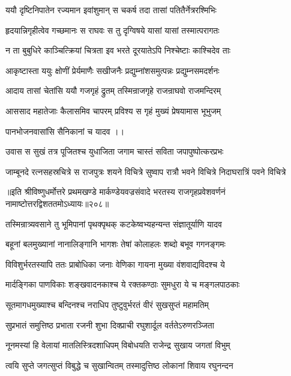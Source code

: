 \twolineshloka
{ययौ दृष्टिनिपातेन रज्यमान इवांशुमान्}
{स चकर्ष तदा तासां पतितैर्नेत्ररश्मिभिः}%

\twolineshloka
{हृदयान्निगृहीत्वेव गच्छमानः स राघवः}
{स तु दृग्विषये यासां यासां तस्मात्परागतः}%

\twolineshloka
{न ता बुबुधिरे काञ्चित्क्रियां चित्रता इव}
{भरते दूरयातेऽपि निश्चेष्टाः काश्चिदेव ताः} %

\twolineshloka
{आकृष्टास्ता ययुः क्षोणीं प्रेर्यमाणैः सखीजनैः}
{प्रद्युम्नांशसमुत्पन्नः प्रद्युम्नसमदर्शनः}%

\twolineshloka
{आदाय तासां चेतांसि ययौ गजगृहं द्रुतम्}
{तस्मिन्राजगृहे राजन्राघवो राजमन्दिरम्}%

\twolineshloka
{आससाद महातेजाः कैलासमिव चापरम्}
{प्रविश्य स गृहं मुख्यं प्रेषयामास भूभुजम्}%

पानभोजनवासांसि सैनिकानां च यादव ।।

\twolineshloka
{उवास स सुखं तत्र पूजितश्च युधाजिता}
{जगाम चास्तं सविता जपापुष्पोत्करप्रभः}%

\twolineshloka
{जाम्बूनदे रत्नसहस्रचित्रे स राजपुत्रः शयने विचित्रे}
{सुष्वाप रात्रौ भवने विचित्रे निदाघरात्रिं पवने विचित्रे}%

॥इति श्रीविष्णुधर्मोत्तरे प्रथमखण्डे मार्कण्डेयवज्रसंवादे भरतस्य राजगृहप्रवेशवर्णनं नामाष्टोत्तरद्विशततमोऽध्यायः॥२०८॥



\twolineshloka
{तस्मिन्रात्र्यवसाने तु भूमिपानां पृथक्पृथक्}
{कटकेष्वभ्यहन्यन्त संज्ञातूर्याणि यादव}%

\twolineshloka
{बहूनां बलमुख्यानां नानालिङ्गानि भागशः}
{तेषां कोलाहलः शब्दो बभूव गगनङ्गमः}%

\twolineshloka
{विविशुर्भरतस्यापि ततः प्राबोधिका जनाः}
{वेणिका गायना मुख्या वंशवाद्यविदश्च ये}%

\twolineshloka
{मार्दङ्गिका पाणविकाः शङ्खवादनकाश्च ये}
{रक्तकण्ठाः सुमधुरा ये च मङ्गलपाठकाः}%

\twolineshloka
{सूतमागधमुख्याश्च बन्दिनश्च नराधिप}
{तुष्टुवुर्भरतं वीरं सुखसुप्तं महामतिम्}%

\twolineshloka
{सुप्रभातं समुत्तिष्ठ प्रभाता रजनी शुभा}
{दिक्प्राची रघुशार्दूल वर्ततेऽरुणरञ्जिता}%

\twolineshloka
{नूनमस्यां हि वेलायां मातलिस्त्रिदशाधिपम्}
{विबोधयति राजेन्द्र सुखाय जगतां विभुम्}%

\twolineshloka
{त्वयि सुप्ते जगत्सुप्तं विबुद्धे च सुखान्वितम्}
{तस्मादुत्तिष्ठ लोकानां शिवाय रघुनन्दन}%

